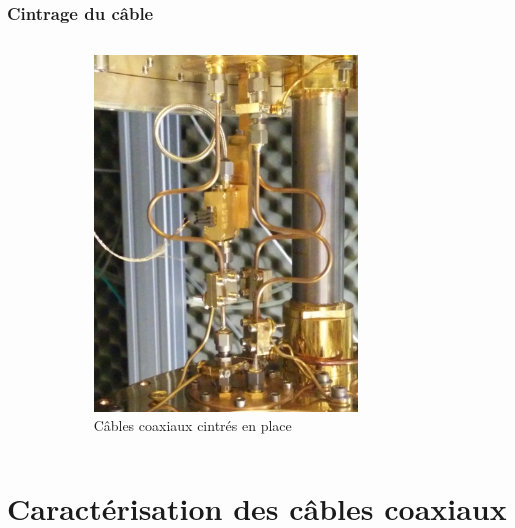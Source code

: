 \documentclass[8pt,a9paper]{beamer} \usepackage[utf8]{inputenc} \usepackage[francais]{babel} \usepackage[T1]{fontenc}
\begin{document}
\begin{frame}
\frametitle{Cintrage du câble}
\begin{columns}
\begin{column}{0.5\textwidth}
    \begin{description}
        \item[]~\\
    \end{description}
\end{column}
\begin{column}{0.5\textwidth}
\begin{figure}[h]
    \begin{center}
        \includegraphics[width=0.7\textwidth]{Images/Coax/cintrage}
        \caption{Câbles coaxiaux cintrés en place}
    \end{center}
\end{figure}
\end{column}
\end{columns}
\end{frame}

\section{Caractérisation des câbles coaxiaux}
\end{document}
